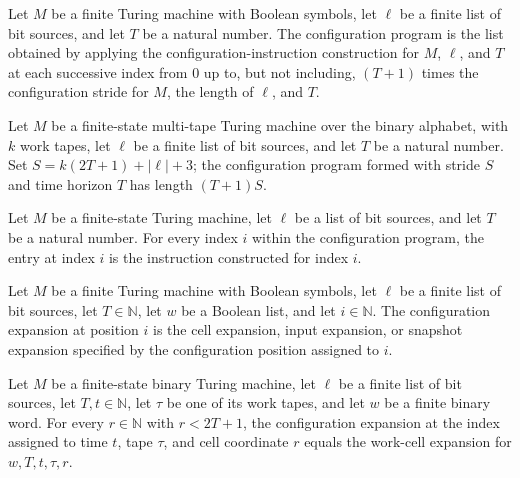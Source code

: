 \begin{definition}
\label{Complexity.cfgProg}
\leanok
{}
Let $M$ be a finite Turing machine with Boolean symbols, let $\ell$ be a finite list of
bit sources, and let $T$ be a natural number. The configuration program is the list
obtained by applying the configuration-instruction construction for $M$, $\ell$, and $T$
at each successive index from $0$ up to, but not including, $(T+1)$ times the
configuration stride for $M$, the length of $\ell$, and $T$.
\end{definition}

\begin{theorem}
\label{Complexity.length_cfgProg}
\leanok
{}
Let $M$ be a finite-state multi-tape Turing machine over the binary alphabet, with $k$
work tapes, let $\ell$ be a finite list of bit sources, and let $T$ be a natural number.
Set $S=k(2T+1)+|\ell|+3$; the configuration program formed with stride $S$ and time
horizon $T$ has length $(T+1)S$.
\end{theorem}

\begin{theorem}
\label{Complexity.cfgProg_getElem}
\leanok
{}
Let $M$ be a finite-state Turing machine, let $\ell$ be a list of bit sources, and let
$T$ be a natural number. For every index $i$ within the configuration program, the entry
at index $i$ is the instruction constructed for index $i$.
\end{theorem}

\begin{definition}
\label{Complexity.cfgExp}
\leanok
{}
Let $M$ be a finite Turing machine with Boolean symbols, let $\ell$ be a finite list of
bit sources, let $T\in\mathbb{N}$, let $w$ be a Boolean list, and let $i\in\mathbb{N}$.
The configuration expansion at position $i$ is the cell expansion, input expansion, or
snapshot expansion specified by the configuration position assigned to $i$.
\end{definition}

\begin{theorem}
\label{Complexity.cfgExp_cellIdx}
\leanok
{}
Let $M$ be a finite-state binary Turing machine, let $\ell$ be a finite list of bit
sources, let $T,t\in\mathbb{N}$, let $\tau$ be one of its work tapes, and let $w$ be a
finite binary word. For every $r\in\mathbb{N}$ with $r<2T+1$, the configuration
expansion at the index assigned to time $t$, tape $\tau$, and cell coordinate $r$ equals
the work-cell expansion for $w,T,t,\tau,r$.
\end{theorem}

